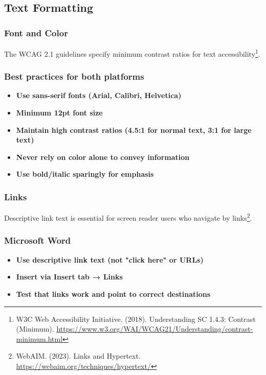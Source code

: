 \subsection{Text Formatting}

\subsubsection{Font and Color}
The WCAG 2.1 guidelines specify minimum contrast ratios for text accessibility\footnote{W3C Web Accessibility Initiative. (2018). Understanding SC 1.4.3: Contrast (Minimum). \url{https://www.w3.org/WAI/WCAG21/Understanding/contrast-minimum.html}}.

\subsubsection{Best practices for both platforms}
\vspace{1em}
\begin{itemize}
\item \textbf{Use sans-serif fonts (Arial, Calibri, Helvetica)}
\item \textbf{Minimum 12pt font size}
\item \textbf{Maintain high contrast ratios (4.5:1 for normal text, 3:1 for large text)}
\item \textbf{Never rely on color alone to convey information}
\item \textbf{Use bold/italic sparingly for emphasis}
\end{itemize}
\vspace{1em}

\subsubsection{Links}
Descriptive link text is essential for screen reader users who navigate by links\footnote{WebAIM. (2023). Links and Hypertext. \url{https://webaim.org/techniques/hypertext/}}.

\subsubsection{Microsoft Word}
\vspace{1em}
\begin{itemize}
\item \textbf{Use descriptive link text (not "click here" or URLs)}
\item \textbf{Insert via Insert tab → Links}
\item \textbf{Test that links work and point to correct destinations}
\end{itemize}
\vspace{1em}

